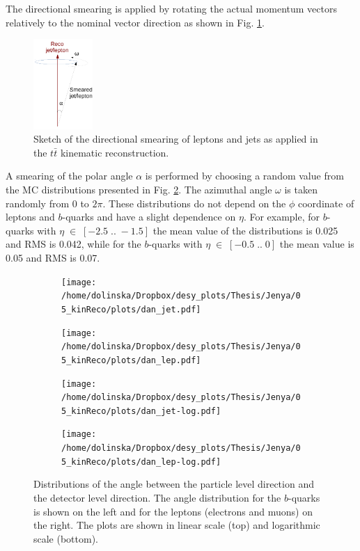 The directional smearing is applied by rotating the actual momentum vectors relatively to the nominal vector direction
as shown in Fig. \ref{fig:angleRot}. 
\begin{figure}[H]
 \centering
 \includegraphics[width=0.2\textwidth]{05_kinReco/plots/angle_rot.pdf}
 \caption{Sketch of the directional smearing of leptons and jets as applied in the $t\bar{t}$ kinematic reconstruction.}
 \label{fig:angleRot}
\end{figure}

A smearing of the polar angle $\alpha$ is performed by choosing a random value from
the MC distributions presented in Fig. \ref{fig:dAngle}. The azimuthal angle $\omega$ is taken randomly from 0 to $2\pi$.
These distributions do not depend on the $\phi$ coordinate of leptons and $b$-quarks and have a slight dependence on $\eta$. For
example, for $b$-quarks with $\eta\;\in\;[-2.5\;..\;-1.5]$ the mean value of the distributions is 0.025 and RMS is 0.042,
while for the $b$-quarks with $\eta\;\in\;[-0.5\;..\;0]$ the mean value is 0.05 and RMS is 0.07.

\begin{figure}[t]
\centering
\begin{subfigure}
  \centering
  \texttt{[image: /home/dolinska/Dropbox/desy\_plots/Thesis/Jenya/05\_kinReco/plots/dan\_jet.pdf]}
\end{subfigure}
\begin{subfigure}
  \centering
  \texttt{[image: /home/dolinska/Dropbox/desy\_plots/Thesis/Jenya/05\_kinReco/plots/dan\_lep.pdf]}
\end{subfigure}
\begin{subfigure}
  \centering
  \texttt{[image: /home/dolinska/Dropbox/desy\_plots/Thesis/Jenya/05\_kinReco/plots/dan\_jet-log.pdf]}
\end{subfigure}
\begin{subfigure}
  \centering
  \texttt{[image: /home/dolinska/Dropbox/desy\_plots/Thesis/Jenya/05\_kinReco/plots/dan\_lep-log.pdf]}
\end{subfigure}
\caption{Distributions of the angle between the particle level direction and the detector level direction.
The angle distribution for the $b$-quarks is shown on the left and for the leptons (electrons and muons) on the right.
The plots are shown in linear scale (top) and logarithmic scale (bottom).}
\label{fig:dAngle}
\end{figure}

